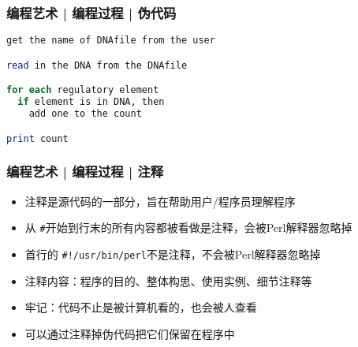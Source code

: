 \begin{frame}[fragile]
  \frametitle{编程艺术 | 编程过程 | \alert{伪代码}}
\begin{lstlisting}[language=Perl]
get the name of DNAfile from the user

read in the DNA from the DNAfile

for each regulatory element
  if element is in DNA, then
    add one to the count

print count
\end{lstlisting}
\end{frame}

\begin{frame}[fragile]
  \frametitle{编程艺术 | 编程过程 | \alert{注释}}
  \begin{itemize}
    \item 注释是源代码的一部分，旨在帮助用户/程序员理解程序
    \item 从 \verb|#|开始到行末的所有内容都被看做是注释，会被Perl解释器忽略掉
    \item 首行的 \verb|#!/usr/bin/perl|不是注释，不会被Perl解释器忽略掉
    \item 注释内容：程序的目的、整体构思、使用实例、细节注释等
    \item 牢记：代码不止是被计算机看的，也会被人查看
    \item 可以通过注释掉伪代码把它们保留在程序中
  \end{itemize}
\end{frame}

